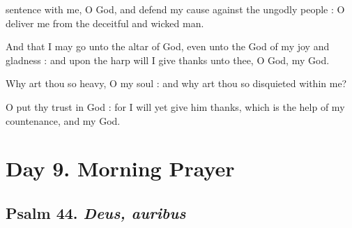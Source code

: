  sentence with me, O God, and defend my cause against the ungodly people : O deliver me from the deceitful and wicked man.\par
{}
And that I may go unto the altar of God, even unto the God of my joy and gladness : and upon the harp will I give thanks unto thee, O God, my God.\par
{}Why art thou so heavy, O my soul : and why art thou so disquieted within me?\par
{}O put thy trust in God : for I will yet give him thanks, which is the help of my countenance, and my God.\par

\clearpage
\section*{Day 9. Morning Prayer}

\subsection{Psalm 44. \textit{Deus, auribus}}

